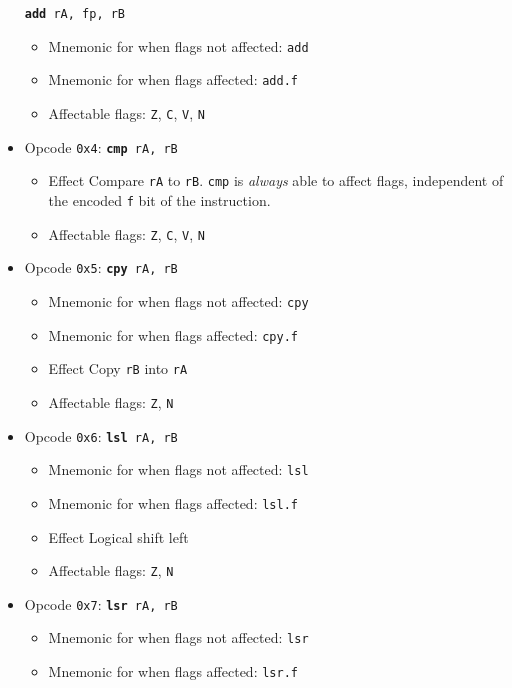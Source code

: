 \documentclass{article}
\begin{document}
\begin{itemize}
		\texttt{\textbf{add} rA, fp, rB}
		\begin{itemize}
		\item Mnemonic for when flags not affected: \texttt{add}
		\item Mnemonic for when flags affected: \texttt{add.f}
		\item Affectable flags:
			\texttt{Z}, \texttt{C}, \texttt{V}, \texttt{N}
		\end{itemize}
	\item Opcode \texttt{0x4}:
		\texttt{\textbf{cmp} rA, rB}
		\begin{itemize}
		\item Effect Compare \texttt{rA} to \texttt{rB}. \texttt{cmp}
		is \textit{always} able to affect flags, independent of the
		encoded \texttt{f} bit of the instruction.
		\item Affectable flags:
			\texttt{Z}, \texttt{C}, \texttt{V}, \texttt{N}
		\end{itemize}
	\item Opcode \texttt{0x5}:
		\texttt{\textbf{cpy} rA, rB}
		\begin{itemize}
		\item Mnemonic for when flags not affected: \texttt{cpy}
		\item Mnemonic for when flags affected: \texttt{cpy.f}
		\item Effect Copy \texttt{rB} into \texttt{rA}
		\item Affectable flags:
			\texttt{Z}, \texttt{N}
		\end{itemize}
	\item Opcode \texttt{0x6}:
		\texttt{\textbf{lsl} rA, rB}
		\begin{itemize}
		\item Mnemonic for when flags not affected: \texttt{lsl}
		\item Mnemonic for when flags affected: \texttt{lsl.f}
		\item Effect Logical shift left
		\item Affectable flags:
			\texttt{Z}, \texttt{N}
		\end{itemize}
	\item Opcode \texttt{0x7}:
		\texttt{\textbf{lsr} rA, rB}
		\begin{itemize}
		\item Mnemonic for when flags not affected: \texttt{lsr}
		\item Mnemonic for when flags affected: \texttt{lsr.f}

\end{itemize}
\end{itemize}
\end{document}
